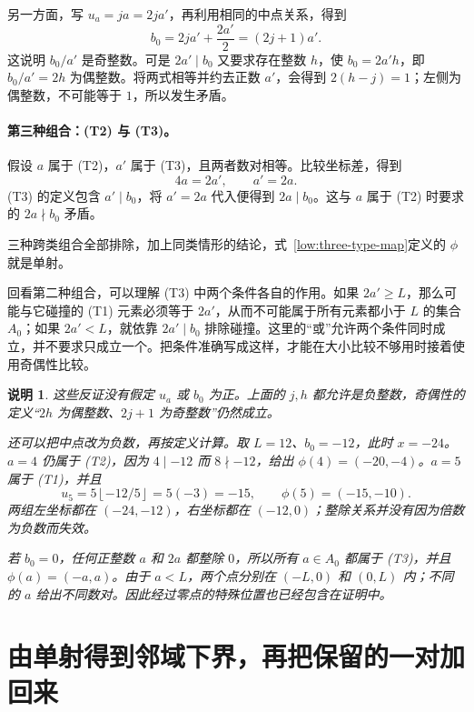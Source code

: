 \documentclass[UTF8,a4paper,oneside,openany,fontset=fandol,zihao=-4]{ctexbook}
\theoremstyle{guide}
\newtheorem{remark}[theorem]{说明}
\newcommand{\floor}[1]{\left\lfloor#1\right\rfloor}
\begin{document}
另一方面，写 $u_a=ja=2ja'$，再利用相同的中点关系，得到
\[
  b_0=2ja'+\frac{2a'}2=(2j+1)a'.
\]
这说明 $b_0/a'$ 是奇整数。可是 $2a'\mid b_0$ 又要求存在整数 $h$，使 $b_0=2a'h$，即 $b_0/a'=2h$ 为偶整数。将两式相等并约去正数 $a'$，会得到 $2(h-j)=1$；左侧为偶整数，不可能等于 $1$，所以发生矛盾。

\paragraph{第三种组合：(T2) 与 (T3)。}
假设 $a$ 属于 (T2)，$a'$ 属于 (T3)，且两者数对相等。比较坐标差，得到
\[
  4a=2a',\qquad a'=2a.
\]
(T3) 的定义包含 $a'\mid b_0$，将 $a'=2a$ 代入便得到 $2a\mid b_0$。这与 $a$ 属于 (T2) 时要求的 $2a\nmid b_0$ 矛盾。

三种跨类组合全部排除，加上同类情形的结论，式~\eqref{low:three-type-map}定义的 $\phi$ 就是单射。

回看第二种组合，可以理解 (T3) 中两个条件各自的作用。如果 $2a'\geq L$，那么可能与它碰撞的 (T1) 元素必须等于 $2a'$，从而不可能属于所有元素都小于 $L$ 的集合 $A_0$；如果 $2a'<L$，就依靠 $2a'\mid b_0$ 排除碰撞。这里的“或”允许两个条件同时成立，并不要求只成立一个。把条件准确写成这样，才能在大小比较不够用时接着使用奇偶性比较。

\begin{remark}\label{low:zero-negative}
这些反证没有假定 $u_a$ 或 $b_0$ 为正。上面的 $j,h$ 都允许是负整数，奇偶性的定义“$2h$ 为偶整数、$2j+1$ 为奇整数”仍然成立。

还可以把中点改为负数，再按定义计算。取 $L=12$、$b_0=-12$，此时 $x=-24$。$a=4$ 仍属于 (T2)，因为 $4\mid-12$ 而 $8\nmid-12$，给出 $\phi(4)=(-20,-4)$。$a=5$ 属于 (T1)，并且
\[
  u_5=5\floor{-12/5}=5(-3)=-15,
  \qquad \phi(5)=(-15,-10).
\]
两组左坐标都在 $(-24,-12)$，右坐标都在 $(-12,0)$；整除关系并没有因为倍数为负数而失效。

若 $b_0=0$，任何正整数 $a$ 和 $2a$ 都整除 $0$，所以所有 $a\in A_0$ 都属于 (T3)，并且 $\phi(a)=(-a,a)$。由于 $a<L$，两个点分别在 $(-L,0)$ 和 $(0,L)$ 内；不同的 $a$ 给出不同数对。因此经过零点的特殊位置也已经包含在证明中。
\end{remark}

\section{由单射得到邻域下界，再把保留的一对加回来}
\end{document}
